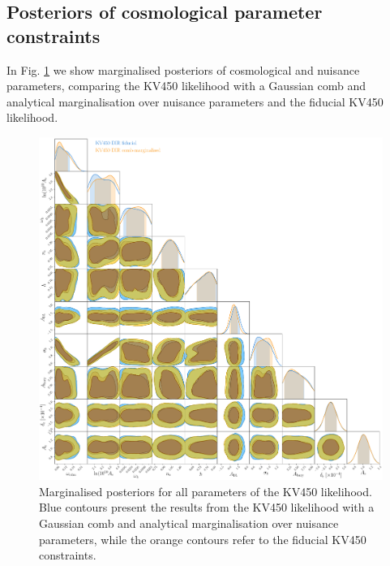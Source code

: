 \documentclass{aa}
\begin{document}
\begin{appendix}
\section{Posteriors of cosmological parameter constraints}
\label{ap:posteriors}
In Fig. \ref{fig:posteriors} we show marginalised posteriors of cosmological and nuisance parameters, comparing the KV450 likelihood with a Gaussian comb and analytical marginalisation over nuisance parameters and the fiducial KV450 likelihood.
\begin{figure}
\centering
\includegraphics[width=\linewidth]{plots/posteriors.pdf}
\caption{Marginalised posteriors for all parameters of the KV450 likelihood. Blue contours present the results from the KV450 likelihood with a Gaussian comb and analytical marginalisation over nuisance parameters, while the orange contours refer to the fiducial KV450 constraints.}
\label{fig:posteriors}
\end{figure}
\end{appendix}
%
\end{document}
